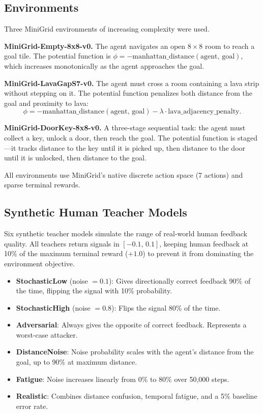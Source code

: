 \documentclass[11pt]{article}
\begin{document}
\subsection{Environments}
\label{sec:envs}

Three MiniGrid environments of increasing complexity were used.

\textbf{MiniGrid-Empty-8x8-v0.}
The agent navigates an open $8{\times}8$ room to reach a goal tile. The
potential function is $\phi = -\mathrm{manhattan\_distance(agent,\, goal)}$,
which increases monotonically as the agent approaches the goal.

\textbf{MiniGrid-LavaGapS7-v0.}
The agent must cross a room containing a lava strip without stepping on it.
The potential function penalizes both distance from the goal and proximity to
lava:
\[
  \phi = -\mathrm{manhattan\_distance(agent,\, goal)}
         - \lambda \cdot \mathrm{lava\_adjacency\_penalty}.
\]

\textbf{MiniGrid-DoorKey-8x8-v0.}
A three-stage sequential task: the agent must collect a key, unlock a door,
then reach the goal. The potential function is staged---it tracks distance to
the key until it is picked up, then distance to the door until it is unlocked,
then distance to the goal.

All environments use MiniGrid's native discrete action space (7 actions) and
sparse terminal rewards.

\subsection{Synthetic Human Teacher Models}

Six synthetic teacher models simulate the range of real-world human feedback
quality. All teachers return signals in $[-0.1,\, 0.1]$, keeping human
feedback at 10\% of the maximum terminal reward ($+1.0$) to prevent it from
dominating the environment objective.

\begin{itemize}
  \item \textbf{StochasticLow} (noise $= 0.1$): Gives directionally correct
        feedback 90\% of the time, flipping the signal with 10\% probability.
  \item \textbf{StochasticHigh} (noise $= 0.8$): Flips the signal 80\% of
        the time.
  \item \textbf{Adversarial}: Always gives the opposite of correct feedback.
        Represents a worst-case attacker.
  \item \textbf{DistanceNoise}: Noise probability scales with the agent's
        distance from the goal, up to 90\% at maximum distance.
  \item \textbf{Fatigue}: Noise increases linearly from 0\% to 80\% over
        50{,}000 steps.
  \item \textbf{Realistic}: Combines distance confusion, temporal fatigue,
        and a 5\% baseline error rate.
\end{itemize}
\end{document}
